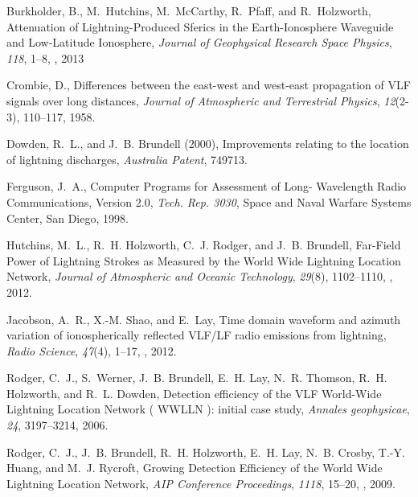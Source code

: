 \documentclass[draft,jgrga]{AGUTeX}
\begin{document}
\begin{article}
\begin{thebibliography}{12}
Burkholder, B., M.~Hutchins, M.~McCarthy, R.~Pfaff, and R.~Holzworth,
  {Attenuation of Lightning-Produced Sferics in the Earth-Ionosphere Waveguide
  and Low-Latitude Ionosphere}, \textit{Journal of Geophysical Research Space
  Physics}, \textit{118}, 1--8, , 2013

Crombie, D., {Differences between the east-west and west-east propagation of
  VLF signals over long distances}, \textit{Journal of Atmospheric and
  Terrestrial Physics}, \textit{12}(2-3), 110--117, 1958.

Dowden, R.~L., and J.~B. Brundell (2000), {Improvements relating to the
  location of lightning discharges}, \textit{Australia Patent}, 749713.

Ferguson, J.~A., {Computer Programs for Assessment of Long- Wavelength Radio
  Communications, Version 2.0}, \textit{Tech. Rep. 3030}, Space and Naval
  Warfare Systems Center, San Diego, 1998.

Hutchins, M.~L., R.~H. Holzworth, C.~J. Rodger, and J.~B. Brundell, {Far-Field
  Power of Lightning Strokes as Measured by the World Wide Lightning Location
  Network}, \textit{Journal of Atmospheric and Oceanic Technology},
  \textit{29}(8), 1102--1110, , 2012.

Jacobson, A.~R., X.-M. Shao, and E.~Lay, {Time domain waveform and azimuth
  variation of ionospherically reflected VLF/LF radio emissions from
  lightning}, \textit{Radio Science}, \textit{47}(4), 1--17,
  , 2012.

Rodger, C.~J., S.~Werner, J.~B. Brundell, E.~H. Lay, N.~R. Thomson, R.~H.
  Holzworth, and R.~L. Dowden, {Detection efficiency of the VLF World-Wide
  Lightning Location Network ( WWLLN ): initial case study}, \textit{Annales
  geophysicae}, \textit{24}, 3197--3214, 2006.

Rodger, C.~J., J.~B. Brundell, R.~H. Holzworth, E.~H. Lay, N.~B. Crosby, T.-Y.
  Huang, and M.~J. Rycroft, {Growing Detection Efficiency of the World Wide
  Lightning Location Network}, \textit{AIP Conference Proceedings},
  \textit{1118}, 15--20, , 2009.


\end{thebibliography}
\end{article}
\end{document}
